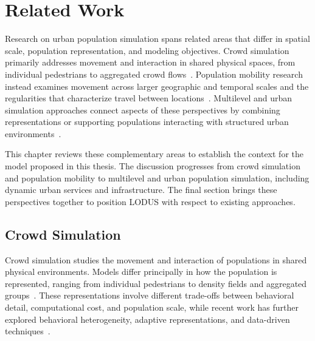 \chapter{Related Work}
\label{chapter:related_work}

Research on urban population simulation spans related areas that differ in spatial scale, population representation, and modeling objectives. Crowd simulation primarily addresses movement and interaction in shared physical spaces, from individual pedestrians to aggregated crowd flows~\cite{thalmann2007crowd,ijaz2015hybridSurvey}. Population mobility research instead examines movement across larger geographic and temporal scales and the regularities that characterize travel between locations~\cite{brockmann2006scaling,gonzalez2008understanding,natureAlessandretti2017multiScaleSpatioTemporal}. Multilevel and urban simulation approaches connect aspects of these perspectives by combining representations or supporting populations interacting with structured urban environments~\cite{serana2023multilevelmodeling,balmer2009matsim,taillandier2019gama}.

This chapter reviews these complementary areas to establish the context for the model proposed in this thesis. The discussion progresses from crowd simulation and population mobility to multilevel and urban population simulation, including dynamic urban services and infrastructure. The final section brings these perspectives together to position LODUS with respect to existing approaches.

\section{Crowd Simulation}
\label{related:crowd_simulation}

Crowd simulation studies the movement and interaction of populations in shared physical environments. Models differ principally in how the population is represented, ranging from individual pedestrians to density fields and aggregated groups~\cite{thalmann2007crowd,ijaz2015hybridSurvey}. These representations involve different trade-offs between behavioral detail, computational cost, and population scale, while recent work has further explored behavioral heterogeneity, adaptive representations, and data-driven techniques~\cite{khan2024heterogeneousSurvey,zhang2023collectiveBehavior}.

